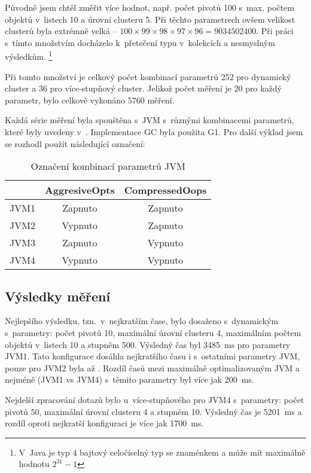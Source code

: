 Původně jsem chtěl změřit více hodnot, např. počet pivotů 100 s~max. počtem objektů v~listech 10 a úrovní clusteru 5.
Při těchto parametrech ovšem velikost clusterů byla extrémně velká -- $100 \times 99 \times 98 \times 97 \times 96 = 9034502400$.
Při práci s~tímto množstvím docházelo k~přetečení typu  v~kolekcích a nesmyslným výsledkům.
\footnote{V~Java je typ  4 bajtový celočíselný typ se znaménkem a může mít maximálně hodnotu $2^{31}-1$}

Při tomto množství je celkový počet kombinací parametrů 252 pro dynamický cluster a 36 pro více-stupňový cluster.
Jelikož počet měření je 20 pro každý parametr, bylo celkově vykonáno 5760 měření.

Každá série měření byla spouštěna s~JVM s~různými kombinacemi parametrů, které byly uvedeny v~.
Implementace GC byla použita G1.
Pro další výklad jsem se rozhodl použít následující označení:

\begin{table}[h]
\center
\begin{tabular}{|l  || c | c |}
\hline
& AggresiveOpts & CompressedOops \\ \hline
\hline
JVM1 & Zapnuto & Zapnuto \\ \hline
JVM2 & Vypnuto & Zapnuto \\ \hline
JVM3 & Zapnuto & Vypnuto \\ \hline
JVM4 & Vypnuto & Vypnuto \\ \hline
\end{tabular}
\caption{Označení kombinací parametrů JVM}
\end{table}

\subsection{Výsledky měření}
Nejlepšího výsledku, tzn.~v~nejkratším čase, bylo dosaženo s~dynamickým  s~parametry: počet pivotů 10, maximální úrovní clusteru 4, maximálním počtem objektů v~listech 10 a stupněm \BPTree{} 500.
Výsledný čas byl \SI{3485}{\ms} pro parametry JVM1.
Tato konfigurace dosáhla nejkratšího času i s~ostatními parametry JVM, pouze pro JVM2 byla až .
Rozdíl časů mezi maximálně optimalizovaným JVM a nejméně (JVM1 vs JVM4) s~těmito parametry byl více jak \SI{200}{\ms}.

Nejdelší zpracování dotazů bylo u~více-stupňového  pro JVM4 s~parametry: počet pivotů 50, maximální úrovní clusteru 4 a stupněm \BPTree{} 10.
Výsledný čas je \SI{5201}{\ms} a rozdíl oproti nejkratší konfiguraci je více jak \SI{1700}{\ms}.

